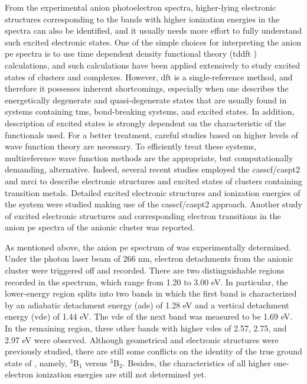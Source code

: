 \begin{refsection}
From the experimental anion photoelectron spectra, higher-lying electronic structures corresponding to the bands with higher ionization energies in the spectra can also be identified, and it usually needs more effort to fully understand such excited electronic states. One of the simple choices for interpreting the anion \acrshort{pe} spectra is to use time dependent density functional theory (\acrshort{tddft} ) calculations, and such calculations have been applied extensively to study excited states of clusters and complexes.\cite{c3:17, c3:18, c3:19, c3:20, c3:21} However, \acrshort{dft}  is a single-reference method, and therefore it possesses inherent shortcomings, especially when one describes the energetically degenerate and quasi-degenerate states that are usually found in systems containing \acrshort{tm}s, bond-breaking systems, and excited states.\cite{c3:22} In addition, description of excited states is strongly dependent on the characteristic of the functionals used. For a better treatment, careful studies based on higher levels of wave function theory are necessary. To efficiently treat these systems, multireference wave function methods are the appropriate, but computationally demanding, alternative. Indeed, several recent studies employed the \acrshort{casscf}/\acrshort{caspt2} and \acrshort{mrci} to describe electronic structures and excited states of clusters containing transition metals.\cite{c3:23, c3:24, c3:25, c3:26, c3:27, c3:28, c3:29, c3:30} Detailed excited electronic structures and ionization energies of the  system were studied\cite{c3:31} making use of the \acrshort{casscf}/\acrshort{caspt2} approach. Another study of excited electronic structures and corresponding electron transitions in the anion \acrshort{pe} spectra of the anionic  cluster was reported.\cite{c3:32}




As mentioned above, the anion \acrshort{pe} spectrum of  was experimentally determined.\cite{c3:14} Under the photon laser beam of 266 nm, electron detachments from the anionic cluster  were triggered off and recorded. There are two distinguishable regions recorded in the spectrum, which range from 1.20 to 3.00 eV. In particular, the lower-energy region splits into two bands in which the first band is characterized by an adiabatic detachment energy (\acrshort{ade}) of 1.28 eV and a vertical detachment energy (\acrshort{vde}) of 1.44 eV. The \acrshort{vde} of the next band was measured to be 1.69 eV. In the remaining region, three other bands with higher \acrshort{vde}s of 2.57, 2.75, and 2.97 eV were observed. Although geometrical and electronic structures were previously studied,\cite{c3:14, c3:16} there are still some conflicts on the identity of the true ground state of , namely, $^3$B$_1$ versus $^3$B$_2$. Besides, the characteristics of all higher one-electron ionization energies are still not determined yet.





\end{refsection}
